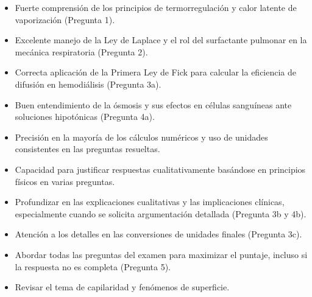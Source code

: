\documentclass[11pt,a4paper]{article}
\begin{document}
\vspace{4pt}
\begin{minipage}[t]{0.48\linewidth}
  \begin{tcolorbox}[cajaFortaleza, title={Fortalezas}]
\begin{itemize}[leftmargin=1.5em, itemsep=2pt]
  \item Fuerte comprensión de los principios de termorregulación y calor latente de vaporización (Pregunta 1).
  \item Excelente manejo de la Ley de Laplace y el rol del surfactante pulmonar en la mecánica respiratoria (Pregunta 2).
  \item Correcta aplicación de la Primera Ley de Fick para calcular la eficiencia de difusión en hemodiálisis (Pregunta 3a).
  \item Buen entendimiento de la ósmosis y sus efectos en células sanguíneas ante soluciones hipotónicas (Pregunta 4a).
  \item Precisión en la mayoría de los cálculos numéricos y uso de unidades consistentes en las preguntas resueltas.
  \item Capacidad para justificar respuestas cualitativamente basándose en principios físicos en varias preguntas.
\end{itemize}
  \end{tcolorbox}
\end{minipage}
\hfill
\begin{minipage}[t]{0.48\linewidth}
  \begin{tcolorbox}[cajaMejora, title={Areas de mejora}]
\begin{itemize}[leftmargin=1.5em, itemsep=2pt]
  \item Profundizar en las explicaciones cualitativas y las implicaciones clínicas, especialmente cuando se solicita argumentación detallada (Pregunta 3b y 4b).
  \item Atención a los detalles en las conversiones de unidades finales (Pregunta 3c).
  \item Abordar todas las preguntas del examen para maximizar el puntaje, incluso si la respuesta no es completa (Pregunta 5).
  \item Revisar el tema de capilaridad y fenómenos de superficie.
\end{itemize}
  \end{tcolorbox}
\end{minipage}

\end{document}
